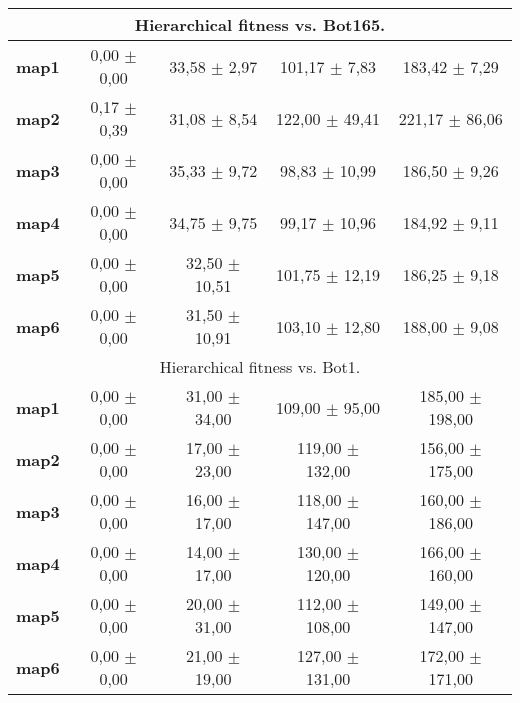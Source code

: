 \begin{table}[htbp]
\begin{tabular}{ccccc}
    \hline
\multicolumn{5}{c}{Hierarchical fitness vs. Bot165.}\\ \hline
\textbf{map1} & 0,00  $\pm$ 0,00  & 33,58 $\pm$ 2,97  & 101,17 $\pm$ 7,83  & 183,42 $\pm$ 7,29 \\
    \textbf{map2} & 0,17  $\pm$ 0,39  & 31,08 $\pm$ 8,54  & 122,00 $\pm$ 49,41 & 221,17 $\pm$ 86,06 \\
    \textbf{map3} & 0,00  $\pm$ 0,00  & 35,33 $\pm$ 9,72  & 98,83 $\pm$ 10,99 & 186,50 $\pm$ 9,26 \\
    \textbf{map4} & 0,00  $\pm$ 0,00  & 34,75 $\pm$ 9,75  & 99,17 $\pm$ 10,96 & 184,92 $\pm$ 9,11 \\
    \textbf{map5} & 0,00  $\pm$ 0,00  & 32,50 $\pm$ 10,51 & 101,75 $\pm$ 12,19 & 186,25 $\pm$ 9,18 \\
    \textbf{map6} & 0,00  $\pm$ 0,00  & 31,50 $\pm$ 10,91 & 103,10 $\pm$ 12,80 & 188,00 $\pm$ 9,08 \\
\hline
\multicolumn{5}{c}{Hierarchical fitness vs. Bot1.}\\ \hline
    \textbf{map1} & 0,00  $\pm$  0,00  & 31,00 $\pm$   34,00 & 109,00 $\pm$  95,00 & 185,00 $\pm$  198,00 \\
    \textbf{map2} & 0,00  $\pm$  0,00  & 17,00 $\pm$   23,00 & 119,00 $\pm$  132,00 & 156,00 $\pm$ 175,00 \\
    \textbf{map3} & 0,00  $\pm$  0,00  & 16,00 $\pm$   17,00 & 118,00 $\pm$  147,00 & 160,00 $\pm$ 186,00 \\
    \textbf{map4} & 0,00  $\pm$  0,00  & 14,00 $\pm$   17,00 & 130,00 $\pm$  120,00 & 166,00 $\pm$ 160,00 \\
    \textbf{map5} & 0,00  $\pm$  0,00  & 20,00 $\pm$   31,00 & 112,00 $\pm$  108,00 & 149,00 $\pm$ 147,00 \\
    \textbf{map6} & 0,00  $\pm$  0,00  & 21,00 $\pm$   19,00 & 127,00 $\pm$  131,00 & 172,00 $\pm$ 171,00 \\
    \hline
   \end{tabular}%
  \label{tab:all}%
\end{table}%
